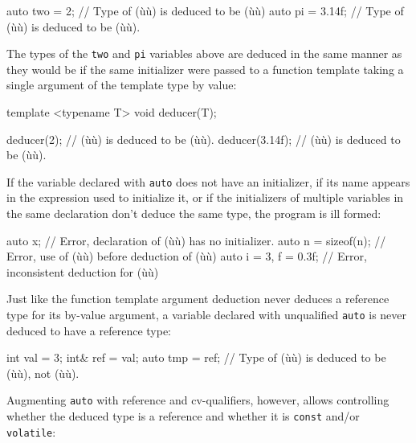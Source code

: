 \begin{emcppslisting}[language=C++]
auto two = 2;     // Type of (ù{}ù) is deduced to be (ù{}ù)
auto pi = 3.14f;  // Type of (ù{}ù) is deduced to be (ù{}ù).
\end{emcppslisting}
    
\noindent The types of the \lstinline!two! and \lstinline!pi! variables above are
deduced in the same manner as they would be if the same initializer were
passed to a function template taking a single argument of the template
type by value:

\begin{emcppslisting}[language=C++]
template <typename T> void deducer(T);

deducer(2);      // (ù{}ù) is deduced to be (ù{}ù).
deducer(3.14f);  // (ù{}ù) is deduced to be (ù{}ù).
\end{emcppslisting}
    
\noindent If the variable declared with \lstinline!auto! does not have an
initializer, if its name appears in the expression used to initialize
it, or if the initializers of multiple variables in the same declaration
don't deduce the same type, the program is ill formed:

\begin{emcppslisting}[language=C++]
auto x;                // Error, declaration of (ù{}ù) has no initializer.
auto n = sizeof(n);    // Error, use of (ù{}ù) before deduction of (ù{}ù)
auto i = 3, f = 0.3f;  // Error, inconsistent deduction for (ù{}ù)
\end{emcppslisting}
    
\noindent Just like the function template argument deduction never deduces a
reference type for its by-value argument, a variable declared with
unqualified \lstinline!auto! is never deduced to have a reference type:

\begin{emcppslisting}[language=C++]
int  val = 3;
int& ref = val;
auto tmp = ref;  // Type of (ù{}ù) is deduced to be (ù{}ù), not (ù{}ù).
\end{emcppslisting}
    
\noindent Augmenting \lstinline!auto! with reference and cv-qualifiers, however,
allows controlling whether the deduced type is a reference and whether
it is \lstinline!const! and/or \lstinline!volatile!:

